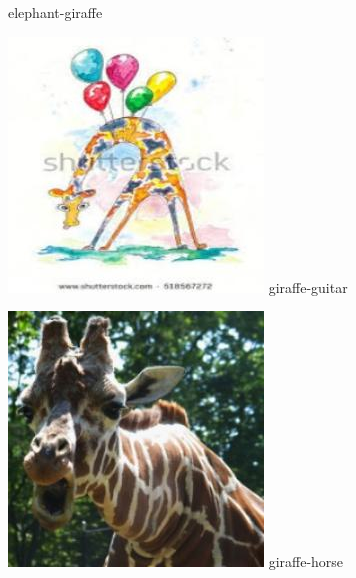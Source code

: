 \documentclass{article}
\begin{document}
\begin{center}
\begin{minipage}{0.142\textwidth}
        elephant-giraffe
    \end{minipage}%
    \begin{minipage}{0.142\textwidth}
        \includegraphics[width=\linewidth]{./pic/misclassified_r2_p3_2723.jpg}
        giraffe-guitar
    \end{minipage}%
    \begin{minipage}{0.142\textwidth}
        \includegraphics[width=\linewidth]{./pic/misclassified_r2_p4_2723.jpg}
        giraffe-horse
    \end{minipage}%


\end{center}
\end{document}
